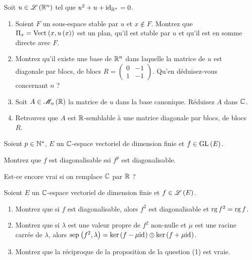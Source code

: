 \begin{exoss}[Exercice 21]
Soit \(u\in\mathscr{L}\left(\mathbb{R}^n\right)\) tel que \(u^2+u+\mathrm{id}_{\mathbb{R}^n}=0\).

\begin{enumerate}
    \item Soient \(F\) un sous-espace stable par \(u\) et \(x\not\in F\). Montrez que \(\Pi_x=\Vect{x,u\paren{x}}\) est un plan, qu'il est stable par \(u\) et qu'il est en somme directe avec \(F\). \\
    \item Montrez qu'il existe une base de \(\mathbb{R}^n\) dans laquelle la matrice de \(u\) est diagonale par blocs, de blocs \(R=\begin{pmatrix}
        0 & -1 \\
        1 & -1
    \end{pmatrix}\). Qu'en déduisez-vous concernant \(n\) ? \\
    \item Soit \(A\in\M{n}[\R]\) la matrice de \(u\) dans la base canonique. Réduisez \(A\) dans \(\mathbb{C}\). \\
    \item Retrouvez que \(A\) est \(\mathbb{R}\)-semblable à une matrice diagonale par blocs, de blocs \(R\).
\end{enumerate}
\end{exoss}

\begin{corr}
\end{corr}

\begin{exoss}[Exercice 22]
Soient \(p\in\mathbb{N}^*\), \(E\) un \(\mathbb{C}\)-espace vectoriel de dimension finie et \(f\in\GL{}[E]\).

Montrez que \(f\) est diagonalisable ssi \(f^p\) est diagonalisable.

Est-ce encore vrai si on remplace \(\mathbb{C}\) par \(\mathbb{R}\) ?
\end{exoss}

\begin{corr}
\end{corr}

\begin{exoss}[Exercice 23]
Soient \(E\) un \(\mathbb{C}\)-espace vectoriel de dimension finie et \(f\in\mathscr{L}\left(E\right)\).

\begin{enumerate}
    \item Montrez que si \(f\) est diagonalisable, alors \(f^2\) est diagonalisable et \(\operatorname{rg} f^2=\operatorname{rg} f\). \\
    \item Montrez que si \(\lambda\) est une valeur propre de \(f^2\) non-nulle et \(\mu\) est une racine carrée de \(\lambda\), alors \(\sep{f^2}{\lambda}=\ker\paren{f-\mu\id{}}\oplus\ker\paren{f+\mu\id{}}\). \\
    \item Montrez que la réciproque de la proposition de la question (1) est vraie.
\end{enumerate}
\end{exoss}

